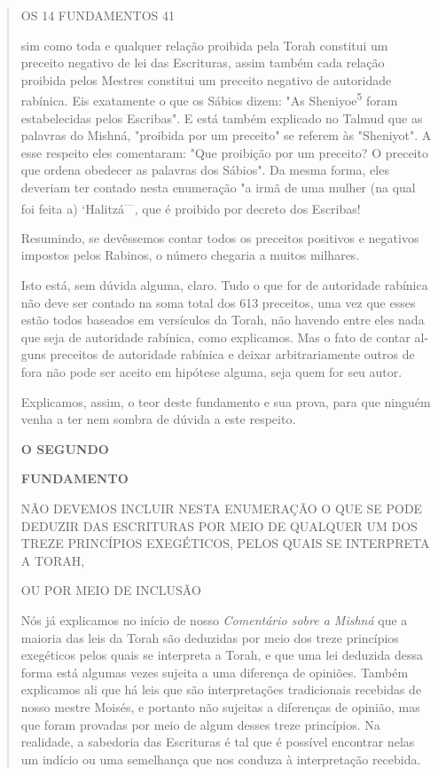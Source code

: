 \begin{quote}
OS 14 FUNDAMENTOS 41

sim como toda e qualquer relação proibida pela Torah constitui um
preceito negativo de lei das Escrituras, assim também cada relação
proibida pelos Mes­tres constitui um preceito negativo de autoridade
rabínica. Eis exatamente o que os Sábios dizem: "As
Sheniyoe\textsuperscript{5} foram estabelecidas pelos Escribas". E es­tá
também explicado no Talmud que as palavras do Mishná, "proibida por um
preceito" se referem às "Sheniyot". A esse respeito eles comentaram:
"Que proi­bição por um preceito? O preceito que ordena obedecer as
palavras dos Sá­bios". Da mesma forma, eles deveriam ter contado nesta
enumeração "a irmã de uma mulher (na qual foi feita a)
`Halitzá\textsuperscript{---}, que é proibido por decreto dos Escribas!

Resumindo, se devêssemos contar todos os preceitos positivos e
ne­gativos impostos pelos Rabinos, o número chegaria a muitos milhares.

Isto está, sem dúvida alguma, claro. Tudo o que for de autoridade
rabínica não deve ser contado na soma total dos 613 preceitos, uma vez
que esses estão todos baseados em versículos da Torah, não havendo entre
eles na­da que seja de autoridade rabínica, como explicamos. Mas o fato
de contar al­guns preceitos de autoridade rabínica e deixar
arbitrariamente outros de fora não pode ser aceito em hipótese alguma,
seja quem for seu autor.

Explicamos, assim, o teor deste fundamento e sua prova, para que ninguém
venha a ter nem sombra de dúvida a este respeito.

\textbf{O SEGUNDO}

\textbf{FUNDAMENTO}

NÃO DEVEMOS INCLUIR NESTA ENUMERAÇÃO O QUE SE PODE DEDUZIR DAS
ESCRITURAS POR MEIO DE QUALQUER UM DOS TREZE PRINCÍPIOS EXEGÉTICOS,
PELOS QUAIS SE INTERPRETA A TORAH,

OU POR MEIO DE INCLUSÃO

Nós já explicamos no início de nosso \emph{Comentário sobre a Mishná}
que a maioria das leis da Torah são deduzidas por meio dos treze
princípios exegéticos pelos quais se interpreta a Torah, e que uma lei
deduzida dessa for­ma está algumas vezes sujeita a uma diferença de
opiniões. Também explica­mos ali que há leis que são interpretações
tradicionais recebidas de nosso mes­tre Moisés, e portanto não sujeitas
a diferenças de opinião, mas que foram pro­vadas por meio de algum
desses treze princípios. Na realidade, a sabedoria das Escrituras é tal
que é possível encontrar nelas um indício ou uma semelhança que nos
conduza à interpretação recebida.


\end{quote}
